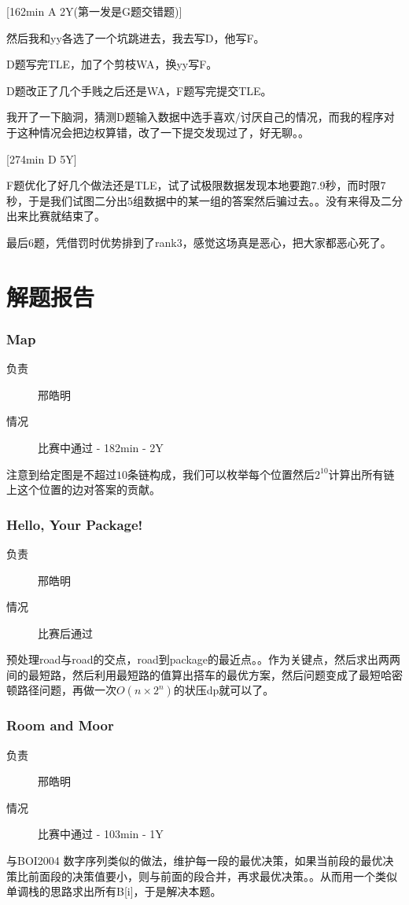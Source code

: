 \documentclass[a4paper, 11pt, nofonts, nocap, fancyhdr]{ctexart}
\newcommand{\problem}[1]{\subsubsection{#1}}
\begin{document}
[162min A 2Y(第一发是G题交错题)]

然后我和yy各选了一个坑跳进去，我去写D，他写F。

D题写完TLE，加了个剪枝WA，换yy写F。

D题改正了几个手贱之后还是WA，F题写完提交TLE。

我开了一下脑洞，猜测D题输入数据中选手喜欢/讨厌自己的情况，而我的程序对于这种情况会把边权算错，改了一下提交发现过了，好无聊。。

[274min D 5Y]

F题优化了好几个做法还是TLE，试了试极限数据发现本地要跑7.9秒，而时限7秒，于是我们试图二分出5组数据中的某一组的答案然后骗过去。。没有来得及二分出来比赛就结束了。

最后6题，凭借罚时优势排到了rank3，感觉这场真是恶心，把大家都恶心死了。 

\section{解题报告}

\problem{Map}

\begin{description}
\item[负责] 邢皓明
\item[情况] 比赛中通过 - 182min - 2Y
\end{description}

注意到给定图是不超过$10$条链构成，我们可以枚举每个位置然后$2^{10}$计算出所有链上这个位置的边对答案的贡献。

\problem{Hello, Your Package!}

\begin{description}
\item[负责] 邢皓明
\item[情况] 比赛后通过
\end{description}

预处理road与road的交点，road到package的最近点。。作为关键点，然后求出两两间的最短路，然后利用最短路的值算出搭车的最优方案，然后问题变成了最短哈密顿路径问题，再做一次$O(n \times 2^n)$的状压dp就可以了。

\problem{Room and Moor}

\begin{description}
\item[负责] 邢皓明
\item[情况] 比赛中通过 - 103min - 1Y
\end{description}

与BOI2004 数字序列类似的做法，维护每一段的最优决策，如果当前段的最优决策比前面段的决策值要小，则与前面的段合并，再求最优决策。。从而用一个类似单调栈的思路求出所有B[i]，于是解决本题。
\end{document}

